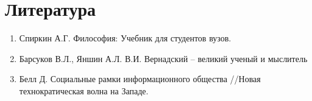 \section{Литература}

\begin{enumerate}

\item{Спиркин А.Г. Философия: Учебник для студентов вузов.}

\item{Барсуков В.Л., Яншин А.Л. В.И. Вернадский – великий ученый и мыслитель}

\item{Белл Д. Социальные рамки информационного общества //Новая технократическая волна на Западе.}

\end{enumerate}
